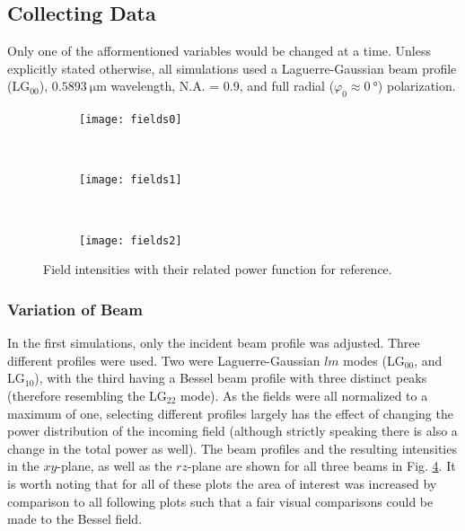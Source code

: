 \documentclass[12pt,a4paper]{article}
\begin{document}
\subsection{Collecting Data}
Only one of the afformentioned variables would be changed at a time. Unless explicitly stated otherwise, all simulations used a Laguerre-Gaussian beam profile (LG$_{00}$), $\SI{0.5893}{\micro\meter}$ wavelength, N.A. = 0.9, and full radial ($\varphi_0 \approx \SI{0}{\degree}$) polarization.

\begin{figure}[p]
     \centering
     \begin{subfigure}[b]{\textwidth}
         \centering
         \texttt{[image: fields0]}
         \label{fig:LG00}
     \end{subfigure}
     \hfill
     \\
     \begin{subfigure}[b]{\textwidth}
         \centering
         \texttt{[image: fields1]}
         \label{fig:LG10}
     \end{subfigure}
     \hfill
     \\
     \begin{subfigure}[b]{\textwidth}
         \centering
         \texttt{[image: fields2]}
         \label{fig:BESS}
     \end{subfigure}
        \caption{Field intensities with their related power function for reference.}
        \label{fig:Fields}
\end{figure}

\subsubsection{Variation of Beam}
In the first simulations, only the incident beam profile was adjusted. Three different profiles were used. Two were Laguerre-Gaussian $lm$ modes (LG$_{00}$, and LG$_{10}$), with the third having a Bessel beam profile with three distinct peaks (therefore resembling the LG$_{22}$ mode). As the fields were all normalized to a maximum of one, selecting different profiles largely has the effect of changing the power distribution of the incoming field (although strictly speaking there is also a change in the total power as well). The beam profiles and the resulting intensities in the $xy$-plane, as well as the $rz$-plane are shown for all three beams in Fig. \ref{fig:Fields}. It is worth noting that for all of these plots the area of interest was increased  by comparison to all following plots such that a fair visual comparisons could be made to the Bessel field.
\end{document}
